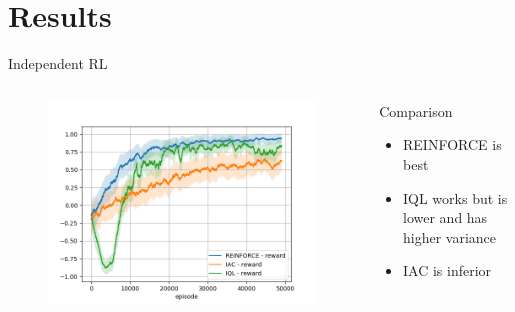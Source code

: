 \documentclass{beamer}
\begin{document}
\section{Results}
\begin{frame}{Independent RL}
\begin{columns}
\begin{figure}[htp]
    \centering
    \includegraphics[width=\textwidth]{images/experiment4/compare_reward.png}
\end{figure}

\begin{block}{Comparison}
\begin{itemize}
    \item REINFORCE is best
    \item IQL works but is lower and has higher variance
    \item IAC is inferior
\end{itemize}
\end{block}
\end{columns}
\end{frame}
\end{document}
